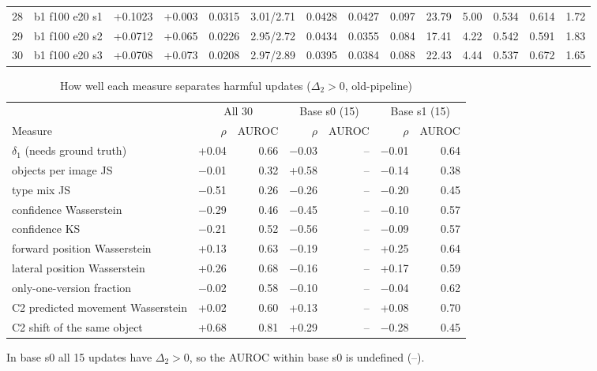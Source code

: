 \documentclass[10pt,a4paper]{article}
\begin{document}
\begin{landscape}
\begin{table}[h!]
\begin{tabular}{rlrrrrrrrrrrrr}
28 & b1 f100 e20 s1 & +0.1023 & +0.003 & 0.0315 & 3.01/2.71 & 0.0428 & 0.0427 & 0.097 & 23.79 & 5.00 & 0.534 & 0.614 & 1.72\\
29 & b1 f100 e20 s2 & +0.0712 & +0.065 & 0.0226 & 2.95/2.72 & 0.0434 & 0.0355 & 0.084 & 17.41 & 4.22 & 0.542 & 0.591 & 1.83\\
30 & b1 f100 e20 s3 & +0.0708 & +0.073 & 0.0208 & 2.97/2.89 & 0.0395 & 0.0384 & 0.088 & 22.43 & 4.44 & 0.537 & 0.672 & 1.65\\
\bottomrule\end{tabular}\end{table}\end{landscape}
\begin{table}[h]\centering\small\caption{How well each measure separates harmful updates ($\Delta_2 > 0$, old-pipeline)}
\begin{tabular}{lrrrrrr}\toprule
 & \multicolumn{2}{c}{All 30} & \multicolumn{2}{c}{Base s0 (15)} & \multicolumn{2}{c}{Base s1 (15)}\\
Measure & $\rho$ & AUROC & $\rho$ & AUROC & $\rho$ & AUROC\\\midrule
$\delta_1$ (needs ground truth) & +0.04 & 0.66 & $-$0.03 & -- & $-$0.01 & 0.64\\
objects per image JS & $-$0.01 & 0.32 & +0.58 & -- & $-$0.14 & 0.38\\
type mix JS & $-$0.51 & 0.26 & $-$0.26 & -- & $-$0.20 & 0.45\\
confidence Wasserstein & $-$0.29 & 0.46 & $-$0.45 & -- & $-$0.10 & 0.57\\
confidence KS & $-$0.21 & 0.52 & $-$0.56 & -- & $-$0.09 & 0.57\\
forward position Wasserstein & +0.13 & 0.63 & $-$0.19 & -- & +0.25 & 0.64\\
lateral position Wasserstein & +0.26 & 0.68 & $-$0.16 & -- & +0.17 & 0.59\\
only-one-version fraction & $-$0.02 & 0.58 & $-$0.10 & -- & $-$0.04 & 0.62\\
C2 predicted movement Wasserstein & +0.02 & 0.60 & +0.13 & -- & +0.08 & 0.70\\
C2 shift of the same object & +0.68 & 0.81 & +0.29 & -- & $-$0.28 & 0.45\\
\bottomrule\end{tabular}\end{table}
In base s0 all 15 updates have $\Delta_2 > 0$, so the AUROC within base s0 is undefined (--).

\FloatBarrier
\end{document}
